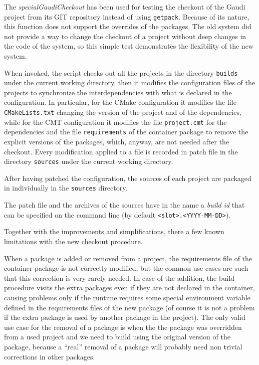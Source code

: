 \documentclass{lhcbnote}
\begin{document}
The \emph{specialGaudiCheckout} has been used for testing the checkout of the
Gaudi project from its GIT repository instead of using \texttt{getpack}.
Because of its nature, this function does not support the overrides of the
packages.  The old system did not provide a way to change the checkout of a
project without deep changes in the code of the system, so this simple test
demonstrates the flexibility of the new system.

When invoked, the script checks out all the projects in the directory
\texttt{builds} under the current working directory, then it modifies the
configuration files of the projects to synchronize the interdependencies with
what is declared in the configuration.  In particular, for the CMake
configuration it modifies the file \texttt{CMakeLists.txt} changing the version
of the project and of the dependencies, while for the CMT configuration it
modifies the file \texttt{project.cmt} for the dependencies and the file
\texttt{requirements} of the container package to remove the explicit versions
of the packages, which, anyway, are not needed after the checkout.  Every
modification applied to a file is recorded in patch file in the directory
\texttt{sources} under the current working directory.

After having patched the configuration, the sources of each project are packaged
in individually in the \texttt{sources} directory.

The patch file and the archives of the sources have in the name a \emph{build
id} that can be specified on the command line (by default
\texttt{<slot>.<YYYY-MM-DD>}).

Together with the improvements and simplifications, there a few known
limitations with the new checkout procedure.

When a package is added or removed from a project, the requirements file of the
container package is not correctly modified, but the common use cases are such
that this correction is very rarely needed.  In case of the addition, the build
procedure visits the extra packages even if they are not declared in the
container, causing problems only if the runtime requires some special
environment variable defined in the requirements files of the new package (of
course it is not a problem if the extra package is used by another package in
the project).  The only valid use case for the removal of a package is when the
the package was overridden from a used project and we need to build using the
original version of the package, because a ``real'' removal of a package will
probably need non trivial corrections in other packages.
\end{document}
